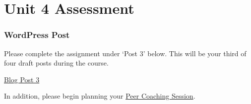 \documentclass[
]{book}
\begin{document}
\hypertarget{unit-4-assessment}{%
\section*{Unit 4 Assessment}\label{unit-4-assessment}}

\begin{wp}
\hypertarget{wordpress-post-1}{%
\subsubsection*{WordPress Post}\label{wordpress-post-1}}

Please complete the assignment under `Post 3' below. This will be your third of four draft posts during the course.

\href{https://ma-lead.github.io/ldrs663/assessments.html\#post-3}{Blog Post 3}

In addition, please begin planning your \href{https://ma-lead.github.io/ldrs663/assessments.html\#peer-coaching-session-15}{Peer Coaching Session}.
\end{wp}
\end{document}
